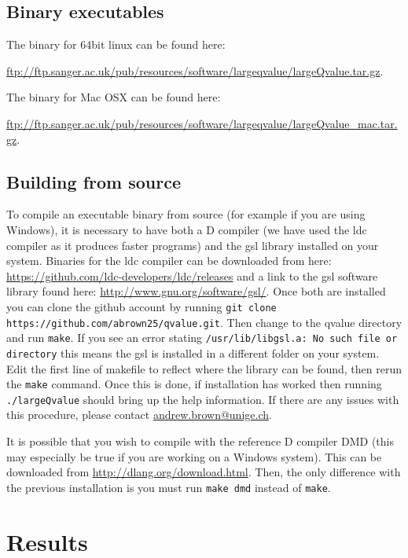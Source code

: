 \documentclass{amsart}
\begin{document}
\subsection{Binary executables}

The binary for 64bit linux can be found here:

\noindent \url{ftp://ftp.sanger.ac.uk/pub/resources/software/largeqvalue/largeQvalue.tar.gz}.

\noindent The binary for Mac OSX can be found here:

\noindent \url{ftp://ftp.sanger.ac.uk/pub/resources/software/largeqvalue/largeQvalue_mac.tar.gz}.

\subsection{Building from source}

To compile an executable binary from source (for example if you are using Windows), it is necessary to have both a D compiler (we have used the ldc compiler as it produces faster programs) and the gsl library installed on your system. Binaries for the ldc compiler can be downloaded from here: \url{https://github.com/ldc-developers/ldc/releases} and a link to the gsl software library found here: \url{http://www.gnu.org/software/gsl/}. Once both are installed you can clone the github account by running \texttt{git clone https://github.com/abrown25/qvalue.git}. Then change to the qvalue directory and run \texttt{make}. If you see an error stating \texttt{/usr/lib/libgsl.a: No such file or directory} this means the gsl is installed in a different folder on your system. Edit the first line of makefile to reflect where the library can be found, then rerun the \texttt{make} command. Once this is done, if installation has worked then running \texttt{./largeQvalue} should bring up the help information. If there are any issues with this procedure, please contact \href{mailto:andrew.brown@unige.ch}{andrew.brown@unige.ch}.

It is possible that you wish to compile with the reference D compiler DMD (this may especially be true if you are working on a Windows system). This can be downloaded from \url{http://dlang.org/download.html}. Then, the only difference with the previous installation is you must run \texttt{make dmd} instead of \texttt{make}.

\section{Results}
\end{document}
